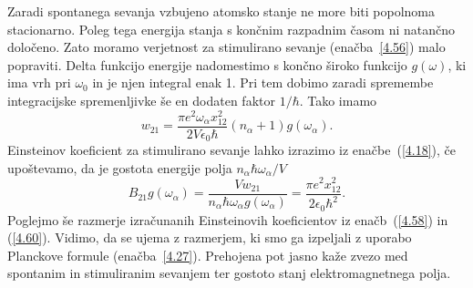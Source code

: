 Zaradi spontanega sevanja vzbujeno atomsko stanje ne more biti popolnoma
stacionarno. Poleg tega energija stanja s končnim razpadnim časom ni natančno
določeno. Zato moramo verjetnost za stimulirano sevanje (enačba~\ref{4.56}) malo 
popraviti. Delta funkcijo energije nadomestimo s končno široko funkcijo $g(\omega)$, 
ki ima vrh pri $\omega_{0}$ in je njen integral enak 1. Pri tem dobimo zaradi 
spremembe integracijske spremenljivke še en dodaten faktor $1/\hbar$. Tako imamo 
\begin{equation}
w_{21}=\frac{\pi e^{2}\omega_{\alpha}x_{12}^{2}}{2V\epsilon_{0}\hbar}
(n_{\alpha}+1)g(\omega_{\alpha}).
\label{4.59}
\end{equation}
Einsteinov koeficient za stimulirano sevanje lahko izrazimo iz enačbe~(\ref{4.18}), 
če upoštevamo, da je gostota energije polja $n_{\alpha}\hbar\omega_{\alpha}/V$
\begin{equation}
B_{21}g(\omega_{\alpha})=\frac{Vw_{21}}{n_{\alpha}\hbar\omega_{\alpha} g(\omega_{\alpha})}
=\frac{\pi e^{2}x_{12}^{2}}{2\epsilon_{0}\hbar^{2}}.
\label{4.60}
\end{equation}
Poglejmo  še razmerje izračunanih Einsteinovih koeficientov iz enačb~(\ref{4.58}) in 
(\ref{4.60}). Vidimo, da se ujema z razmerjem, ki smo ga izpeljali z uporabo
Planckove formule (enačba~\ref{4.27}). Prehojena pot jasno kaže zvezo med spontanim in
stimuliranim sevanjem ter gostoto stanj elektromagnetnega polja. 
